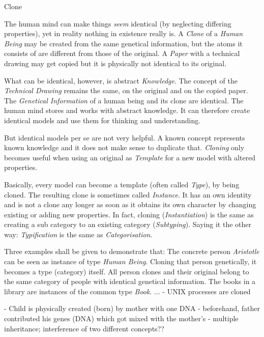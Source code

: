 Clone

The human mind can make things \emph{seem} identical (by neglecting differing
properties), yet in reality nothing in existence really is. A \emph{Clone} of a
\emph{Human Being} may be created from the same genetical information, but the
atoms it consists of are different from those of the original. A \emph{Paper}
with a technical drawing may get copied but it is physically not identical to
its original.

What can be identical, however, is abstract \emph{Knowledge}. The concept of the
\emph{Technical Drawing} remains the same, on the original and on the copied paper.
The \emph{Genetical Information} of a human being and its clone are identical.
The human mind stores and works with abstract knowledge. It can therefore create
identical models and use them for thinking and understanding.

But identical models per se are not very helpful. A known concept represents
known knowledge and it does not make sense to duplicate that. \emph{Cloning} only
becomes useful when using an original as \emph{Template} for a new model with
altered properties.

Basically, every model can become a template (often called \emph{Type}), by being
cloned. The resulting clone is sometimes called \emph{Instance}. It has an own
identity and is not a clone any longer as soon as it obtains its own character by
changing existing or adding new properties. In fact, cloning (\emph{Instantiation})
is the same as creating a sub category to an existing category (\emph{Subtyping}).
Saying it the other way: \emph{Typification} is the same as \emph{Categorisation}.

Three examples shall be given to demonstrate that:
The concrete person \emph{Aristotle} can be seen as instance of type
\emph{Human Being}. Cloning that person genetically, it becomes a type (category)
itself. All person clones and their original belong to the same category of people
with identical genetical information.
The books in a library are instances of the common type \emph{Book}.
...
- UNIX processes are cloned

- Child is physically created (born) by mother with one DNA
- beforehand, father contributed his genes (DNA) which got mixed with the mother's
- multiple inheritance; interference of two different concepts??
